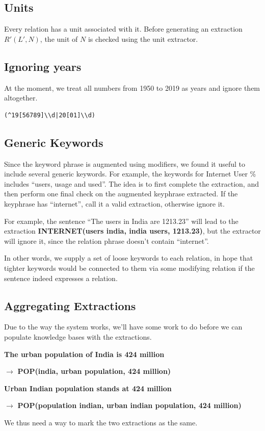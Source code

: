 \documentclass[a4paper,10pt]{article}
\begin{document}
\subsection{Units}
Every relation has a unit associated with it. Before generating an extraction $R'(L', N)$, the unit of $N$ is checked using the unit extractor.

\subsection{Ignoring years}
 At the moment, we treat all numbers from 1950 to 2019 as years and ignore them altogether.
 \begin{verbatim}
(^19[56789]\\d|20[01]\\d)  
 \end{verbatim}

\subsection{Generic Keywords}
Since the keyword phrase is augmented using modifiers, we found it useful to include several generic keywords. For example, 
the keywords for Internet User \% includes ``users, usage and used''. The idea is to first complete the extraction, and then 
perform one final check on the augmented keyphrase extracted. If the keyphrase has ``internet'', call it a valid extraction, otherwise ignore it.

For example, the sentence ``The users in India are 1213.23'' will lead to the extraction \textbf{\color{red} INTERNET(users india, india users, 1213.23)},
but the extractor will ignore it, since the relation phrase doesn't contain ``internet''.

In other words, we supply a set of loose keywords to each relation, in hope that tighter keywords would be connected to them via some modifying relation if the
sentence indeed expresses a relation.


 

\subsection{Aggregating Extractions}
Due to the way the system works, we'll have some work to do before we can populate knowledge bases with the extractions.

\textbf{The urban population of India is 424 million} 

$\rightarrow$ \textbf{\color{red} POP(india, urban population, 424 million)}


\textbf{Urban Indian population stands at 424 million}

$\rightarrow$ \textbf{\color{red} POP(population indian, urban indian population, 424 million)}

We thus need a way to mark the two extractions as the same.


\printbibliography[title=References]
\end{document}
